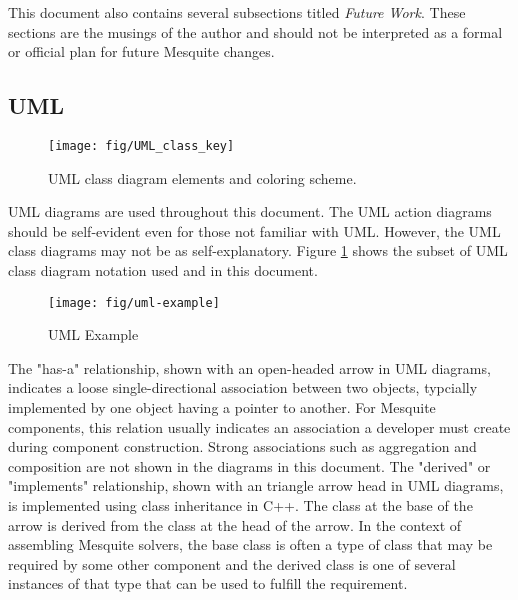 \documentclass{article}
\begin{document}
This document also contains several subsections titled \emph{Future Work}.  These sections are the musings of the author and should not be interpreted as a formal or official plan for future Mesquite changes.


\subsection{UML}

\begin{figure}[htb]
\begin{center}
\texttt{[image: fig/UML\_class\_key]}
\caption{UML class diagram elements and coloring scheme.\label{fig:UML}}
\end{center}
\end{figure}

UML diagrams are used throughout this document.  The UML action diagrams should be self-evident even for those not familiar with UML.  However, the UML class diagrams may not be as self-explanatory.  Figure \ref{fig:UML} shows the subset of UML class diagram notation used and in this document.

\begin{figure}[htb]
\begin{center}
\texttt{[image: fig/uml-example]}
\caption{UML Example\label{fig:UML-Example}}
\end{center}
\end{figure}

The "has-a" relationship, shown with an open-headed arrow in UML diagrams, indicates a loose single-directional association between two objects, typcially implemented by one object having a pointer to another.  For Mesquite components, this relation usually indicates an association a developer must create during component construction.  Strong associations such as aggregation and composition are not shown in the diagrams in this document.  The "derived" or "implements" relationship, shown with an triangle arrow head in UML diagrams, is implemented using class inheritance in C++.  The class at the base of the arrow is derived from the class at the head of the arrow.  In the context of assembling Mesquite solvers, the base class is often a type of class that may be required by some other component and the derived class is one of several instances of that type that can be used to fulfill the requirement.
\end{document}
